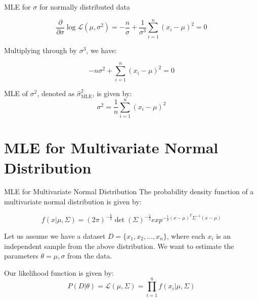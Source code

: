 \documentclass{beamer}
\begin{document}
\begin{frame}{MLE for $\sigma$ for normally distributed data}

    
        \[
        \frac{{\partial}}{{\partial \sigma}} \log \mathcal{L}(\mu, \sigma^2) = -\frac{n}{\sigma} + \frac{1}{\sigma^3} \sum_{i=1}^n (x_i-\mu)^2 = 0
        \]
    
        Multiplying through by $\sigma^3$, we have:
    
        \[
        -n \sigma^2 + \sum_{i=1}^n (x_i-\mu)^2 = 0
        \]
    
        \begin{tcolorbox}[colback=metropolisblue!5,colframe=metropolisblue,title=Maximum Likelihood Estimate for $\sigma^2$]
            MLE of $\sigma^2$, denoted as $\hat{\sigma}^2_{\text{MLE}}$, is given by:
            \[
                \sigma^2 = \frac{1}{n} \sum_{i=1}^n (x_i-\mu)^2
                \]
        \end{tcolorbox}
    
       

    \end{frame}

\section{MLE for Multivariate Normal Distribution}
\begin{frame}{MLE for Multivariate Normal Distribution}
The probability density function of a multivariate normal distribution is given by:

\begin{equation}
f(x|\mu, \Sigma) = (2\pi)^{-\frac{k}{2}}\det(\Sigma)^{-\frac{1}{2}}exp^{-\frac{1}{2}(x-\mu)^{T}\Sigma^{-1}(x-\mu)}
\end{equation}
\end{frame}
\begin{frame}
Let us assume we have a dataset $D = \{x_1, x_2, \ldots, x_n\}$, where each $x_i$ is an independent sample from the above distribution.
We want to estimate the parameters $\theta = {\mu, \sigma}$ from the data.

Our likelihood function is given by:
\begin{equation}
P(D|\theta) = \mathcal{L}(\mu, \Sigma) = \prod_{i=1}^n f(x_i|\mu, \Sigma)
\end{equation}

\end{frame}
\end{document}
